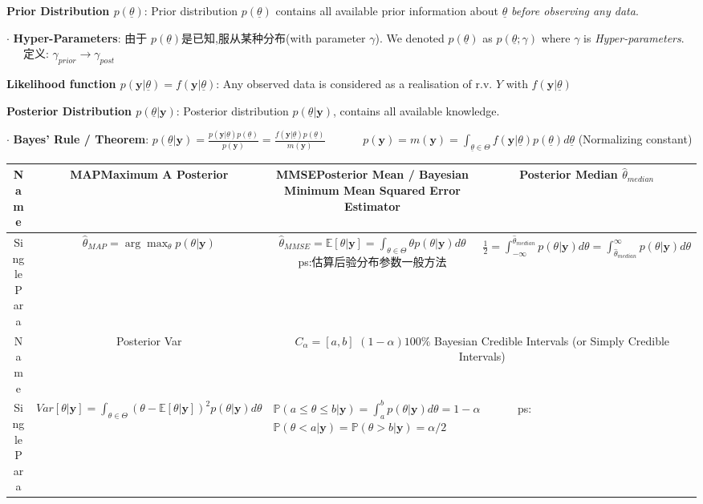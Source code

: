 \documentclass[9pt]{article}
\begin{document}
\textbf{Prior Distribution $p(\underline{\theta})$}: Prior distribution $p(\underline{\theta})$ contains all available prior information about $\underline{\theta}$ \textit{before observing any data}.

$\cdot$ \textbf{Hyper-Parameters}: {\footnotesize 由于 $p(\underline{\theta})$是已知,服从某种分布(with parameter $\gamma$). We denoted $p(\underline{\theta})$ as $p(\underline{\theta};\gamma)$ where $\gamma$ is \textit{Hyper-parameters}.} \ \ \ {\footnotesize 定义: $\gamma_{prior}\to\gamma_{post}$}

\textbf{Likelihood function $p(\mathbf{y}|\underline{\theta})=f(\mathbf{y}|\underline{\theta})$}: Any observed data is considered as a realisation of r.v. $Y$ with $f(\mathbf{y}|\underline{\theta})$

\textbf{Posterior Distribution $p(\underline{\theta}|\mathbf{y})$}: Posterior distribution $p(\underline{\theta}|\mathbf{y})$, contains all available knowledge.

$\cdot$ \textbf{Bayes' Rule / Theorem}: $p(\underline{\theta}|\mathbf{y})=\frac{p(\mathbf{y}|\underline{\theta})p(\underline{\theta})}{p(\mathbf{y})}=\frac{f(\mathbf{y}|\underline{\theta})p(\underline{\theta})}{m(\mathbf{y})}$ \ \ \ \ \ \ $p(\mathbf{y})=m(\mathbf{y})=\int_{\underline{\theta}\in\Theta}f(\mathbf{y}|\underline{\theta})p(\underline{\theta}) d\underline{\theta}$ (Normalizing constant)

\vspace{-0.35cm}
\begin{longtable}{|c|c|c|c|}
    \hline
    Name & MAP{\tiny Maximum A Posterior} & MMSE{\tiny Posterior Mean / Bayesian Minimum Mean Squared Error Estimator} & Posterior Median $\widehat{\theta}_{median}$ \\
    \hline
    {\scriptsize Single Para} & {\footnotesize $\widehat{\theta}_{MAP}=\arg\max_\theta p(\theta|\mathbf{y})$} & {\scriptsize $\widehat{\theta}_{MMSE}=\mathbb{E}[\theta|\mathbf{y}]=\int_{\theta\in\Theta}\theta p(\theta|\mathbf{y})d\theta$} {\tiny ps:估算后验分布参数一般方法} & {\scriptsize $\frac{1}{2}=\int_{-\infty}^{\widehat{\theta}_{median}}p(\theta|\mathbf{y})d\theta=\int_{\widehat{\theta}_{median}}^{\infty}p(\theta|\mathbf{y})d\theta$} \\
    \hline
    \hline
    Name & Posterior Var & \multicolumn{2}{c|}{$C_{\alpha}=[a,b]$ \scriptsize $(1-\alpha)100\%$ Bayesian Credible Intervals (or Simply Credible Intervals)} \\
    \hline
    {\scriptsize Single Para} & {\footnotesize $Var[\theta|\mathbf{y}]=\int_{\theta\in\Theta}(\theta-\mathbb{E}[\theta|\mathbf{y}])^2p(\theta|\mathbf{y})d\theta$} & \multicolumn{2}{l|}{\footnotesize $\mathbb{P}(a\leq\theta\leq b|\mathbf{y})=\int_{a}^{b}p(\theta|\mathbf{y})d\theta=1-\alpha$ \ \ \ \ \ \ ps: $\mathbb{P}(\theta<a|\mathbf{y})=\mathbb{P}(\theta>b|\mathbf{y})=\alpha/2$} \\
    \hline
\end{longtable}
\vspace{-0.35cm}
\end{document}
